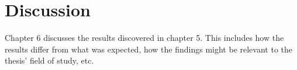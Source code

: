 \chapter{Discussion}
\label{ch:discussion}
Chapter 6 discusses the results discovered in chapter 5.
This includes how the results differ from what was expected, how the findings might be relevant to the thesis' field of study, etc.
